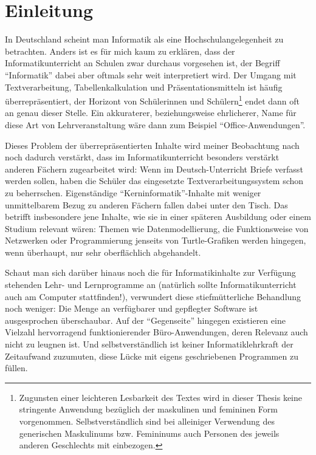 \section{Einleitung}
\label{sec:introduction}

In Deutschland scheint man Informatik als eine Hochschulangelegenheit zu betrachten. Anders ist es für mich kaum zu erklären, dass der Informatikunterricht an Schulen zwar durchaus vorgesehen ist, der Begriff "`Informatik"' dabei aber oftmals sehr weit interpretiert wird. Der Umgang mit Textverarbeitung, Tabellenkalkulation und Präsentationsmitteln ist häufig überrepräsentiert, der Horizont von Schülerinnen und Schülern\footnote{Zugunsten einer leichteren Lesbarkeit des Textes wird in dieser Thesis keine stringente Anwendung bezüglich der maskulinen und femininen Form vorgenommen. Selbstverständlich sind bei alleiniger Verwendung des generischen Maskulinums bzw. Femininums auch Personen des jeweils anderen Geschlechts mit einbezogen.} endet dann oft an genau dieser Stelle. Ein akkuraterer, beziehungsweise ehrlicherer, Name für diese Art von Lehrveranstaltung wäre dann zum Beispiel "`Office-Anwendungen"'.

Dieses Problem der überrepräsentierten Inhalte wird meiner Beobachtung nach noch dadurch verstärkt, dass im Informatikunterricht besonders verstärkt anderen Fächern zugearbeitet wird: Wenn im Deutsch-Unterricht Briefe verfasst werden sollen, haben die Schüler das eingesetzte Textverarbeitungssystem schon zu beherrschen. Eigenständige "`Kerninformatik"'-Inhalte mit weniger unmittelbarem Bezug zu anderen Fächern fallen dabei unter den Tisch. Das betrifft insbesondere jene Inhalte, wie sie in einer späteren Ausbildung oder einem Studium relevant wären: Themen wie Datenmodellierung, die Funktionsweise von Netzwerken oder Programmierung jenseits von Turtle-Grafiken werden hingegen, wenn überhaupt, nur sehr oberflächlich abgehandelt.

Schaut man sich darüber hinaus noch die für Informatikinhalte zur Verfügung stehenden Lehr- und Lernprogramme an (natürlich sollte Informatikunterricht auch am Computer stattfinden!), verwundert diese stiefmütterliche Behandlung noch weniger: Die Menge an verfügbarer und gepflegter Software ist ausgesprochen überschaubar. Auf der "`Gegenseite"' hingegen existieren eine Vielzahl hervorragend funktionierender Büro-Anwendungen, deren Relevanz auch nicht zu leugnen ist. Und selbstverständlich ist keiner Informatiklehrkraft der Zeitaufwand zuzumuten, diese Lücke mit eigens geschriebenen Programmen zu füllen.

